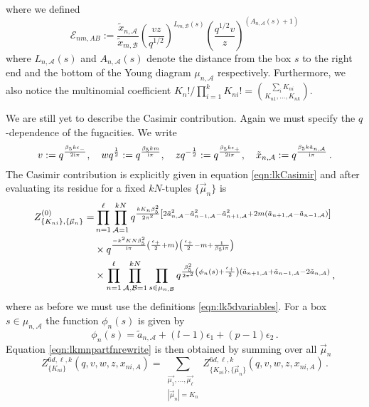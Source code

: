 \documentclass[main.tex]{subfiles}
\begin{document}
where we defined
\begin{equation}\label{eqn:Eip}
\mathcal{E}_{nm,AB}:=\frac{\tilde{x}_{n,\mathcal{A}}}{\tilde{x}_{m,\mathcal{B}}}\left(\frac{vz}{q^{1/2}}\right)^{L_{m,\mathcal{B}}(s)}\left(\frac{q^{1/2}v}{z}\right)^{\left(A_{n,\mathcal{A}}(s)+1\right)}
\end{equation}
where $L_{n,\mathcal{A}}(s)$ and $A_{n,\mathcal{A}}(s)$ denote the distance from the box $s$ to the right end and the bottom of the Young diagram $\mu_{n,\mathcal{A}}$ respectively.
Furthermore, we also notice the multinomial coefficient $K_n!/\prod_{i=1}^kK_{ni}!=\binom{\sum_i K_{ni}}{K_{n1},\dots,K_{nk}}$.

We are still yet to describe the Casimir contribution. Again we must specify the $q$-dependence of the fugacities. We write
\begin{equation}\label{eqn:lk5dvariables}
v:=q^{\frac{\beta_5k\epsilon_-}{2\mathrm{i}\pi}},\quad wq^{\frac{1}{2}}:=q^{\frac{\beta_5km}{\mathrm{i}\pi}},\quad zq^{-\frac{1}{2}}:=q^{\frac{\beta_5k\epsilon_+}{2\mathrm{i}\pi}},\quad \tilde{x}_{n,\mathcal{A}}:=q^{\frac{\beta_5k\tilde{a}_{n,\mathcal{A}}}{\mathrm{i}\pi}}\,.
\end{equation}
The Casimir contribution is explicitly given in equation \eqref{eqn:lkCasimir} and after evaluating its residue for a fixed $kN$-tuples $\{\vec{\mu}_n\}$ is
\begin{equation}
\begin{aligned}
Z^{(0)}_{\{K_{ni}\},\{\vec{\mu}_n\}}=&\prod_{n=1}^{\ell}\prod_{\mathcal{A}=1}^{kN}q^{\frac{kK_n\beta_5^2}{2\pi^2}\left[2\tilde{a}_{n,\mathcal{A}}^2-\tilde{a}_{n-1,\mathcal{A}}^2-\tilde{a}_{n+1,\mathcal{A}}^2+2m\left(\tilde{a}_{n+1,\mathcal{A}}-\tilde{a}_{n-1,\mathcal{A}}\right)\right]}\\
&\times q^{\frac{-k^2KN\beta_5^2}{\mathrm{i}\pi}\left(\frac{\epsilon_+}{2}+m\right)\left(\frac{\epsilon_+}{2}-m+\frac{1}{\beta_5\mathrm{i}\pi}\right)}\\
&\times\prod_{n=1}^{\ell}\prod_{\mathcal{A},\mathcal{B}=1}^{kN}\prod_{s\in \mu_{n,\mathcal{B}}}q^{\frac{\beta_5^2}{2\pi^2}\left(\phi_n(s)+\frac{\epsilon_+}{2}\right)\left(\tilde{a}_{n+1,\mathcal{A}}+\tilde{a}_{n-1,\mathcal{A}}-2\tilde{a}_{n,\mathcal{A}}\right)}\,,
\end{aligned}
\end{equation}
where as before we must use the definitions \eqref{eqn:lk5dvariables}. 
For a box $s\in \mu_{n,\mathcal{A}}$ the function $\phi_n(s)$ is given by
\begin{equation}
\phi_n(s)=\tilde{a}_{n,\mathcal{A}}+(l-1)\epsilon_1+(p-1)\epsilon_2\,.
\end{equation}
Equation \eqref{eqn:lkmnpartfnrewrite} is then obtained by summing over all $\vec{\mu}_n$
\begin{equation}\label{eqn:lkmnpartfnrewriteresi}
Z^{6d,\ell,k}_{\{K_{ni}\}}(q,v,w,z,x_{ni,A})=\sum_{\substack{\vec{\mu_1},\dots,\vec{\mu_{\ell}}\\|\vec{\mu}_n|=K_n}}Z^{6d,\ell,k}_{\{K_{ni}\},\{\vec{\mu}_n\}}(q,v,w,z,x_{ni,A})\,.
\end{equation}
\end{document}
